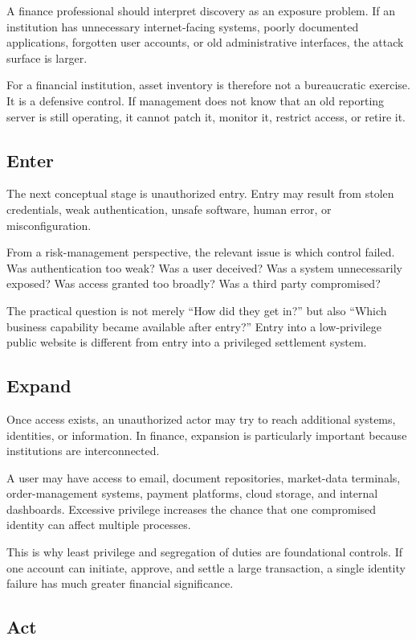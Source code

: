 A finance professional should interpret discovery as an exposure problem. If an institution has unnecessary internet-facing systems, poorly documented applications, forgotten user accounts, or old administrative interfaces, the attack surface is larger.

For a financial institution, asset inventory is therefore not a bureaucratic exercise. It is a defensive control. If management does not know that an old reporting server is still operating, it cannot patch it, monitor it, restrict access, or retire it.

\subsection{Enter}

The next conceptual stage is unauthorized entry. Entry may result from stolen credentials, weak authentication, unsafe software, human error, or misconfiguration.

From a risk-management perspective, the relevant issue is which control failed. Was authentication too weak? Was a user deceived? Was a system unnecessarily exposed? Was access granted too broadly? Was a third party compromised?

The practical question is not merely ``How did they get in?'' but also ``Which business capability became available after entry?'' Entry into a low-privilege public website is different from entry into a privileged settlement system.

\subsection{Expand}

Once access exists, an unauthorized actor may try to reach additional systems, identities, or information. In finance, expansion is particularly important because institutions are interconnected.

A user may have access to email, document repositories, market-data terminals, order-management systems, payment platforms, cloud storage, and internal dashboards. Excessive privilege increases the chance that one compromised identity can affect multiple processes.

This is why least privilege and segregation of duties are foundational controls. If one account can initiate, approve, and settle a large transaction, a single identity failure has much greater financial significance.

\subsection{Act}

